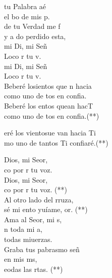 \begin{cancion}[Hacia Ti][Ixcís]%
	tu Palabra aé\\
	el bo de mis p. \\
	de tu Verdad me f \\
	y a do perdido esta,\\
	mi Di, mi Señ\\
	Loco  r tu v.\\
	mi Di, mi Señ\\
	Loco  r tu v.\\
	\jump
	Beberé losientos que n hacia \\
	como uno de tos en  confia.\\
	Beberé los entos quean hacT \\
	como uno de tos en  confia.(**)\jump\\
	\begin{chorus}%
		eré los vientosue van hacia Ti\\
		mo uno de tantos Ti confiaré.(**)\jump\\
	\end{chorus}%
	Dios, mi Seor,\\
	co por r tu voz.\\
	Dios, mi Seor,\\
	co por r tu voz. (**)\\
	\jump
	Al otro lado del rruza,\\
	sé mi ento yuíame, or. (**)\\
	\jump
	Ama al Seor, mi s,\\
	n toda mi a, \\
	 todas miuerzas.\\
	Graba tus pabrasmo señ\\
	en mis ms, \\
	eodas las rtas. (**)\\
\end{cancion}%
